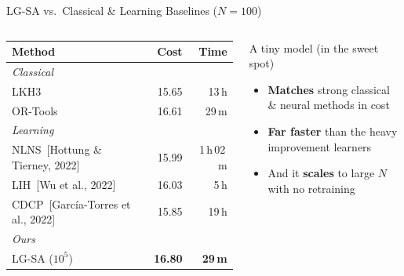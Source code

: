 \documentclass{beamer}
\newcommand{\highlight}[1]{\textcolor{myorange}{\textbf{#1}}}
\newcommand{\good}[1]{\textcolor{mygreen!60!black}{\textbf{#1}}}
\begin{document}
\begin{frame}{LG-SA vs.\ Classical \& Learning Baselines ($N=100$)}
  \begin{columns}[T]
    \footnotesize
    \setlength{\tabcolsep}{3pt}
    \begin{tabular}{lrr}
      \toprule
      Method & Cost & Time \\
      \midrule
      \textit{Classical} & & \\
      LKH3                       & 15.65 & 13\,h \\
      OR-Tools                   & 16.61 & 29\,m \\
      \midrule
      \textit{Learning} & & \\
      NLNS~{\tiny[Hottung \& Tierney, 2022]}     & 15.99 & 1\,h\,02\,m \\
      LIH~{\tiny[Wu et al., 2022]}               & 16.03 & 5\,h \\
      CDCP~{\tiny[Garc\'ia-Torres et al., 2022]} & 15.85 & 19\,h \\
      \midrule
      \textit{Ours} & & \\
      \rowcolor{myorange!30}
      LG-SA ($10^5$) & \good{16.80} & \good{29\,m} \\
      \bottomrule
    \end{tabular}

    \vspace{0.6em}
    \begin{alertblock}{A tiny model \scriptsize{(in the sweet spot)}}
      \small
      \begin{itemize}\itemsep3pt
        \item \good{Matches} strong classical \& neural methods in cost
        \item \good{Far faster} than the heavy improvement learners
        \item And it \highlight{scales} to large $N$ with no retraining
      \end{itemize}
    \end{alertblock}
  \end{columns}
\end{frame}
\end{document}
